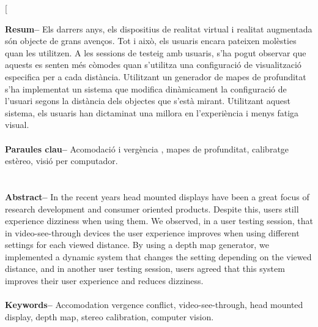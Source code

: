 \documentclass[10pt,a4paper,twocolumn,twoside]{article}
\begin{document}
	\twocolumn[\begin{@twocolumnfalse}
	
	
	\maketitle
	
	\thispagestyle{primerapagina}
	\begin{center}
	\parbox{0.915\textwidth}
	{\sffamily
	\textbf{Resum--}
	Els darrers anys, els dispositius de realitat virtual i realitat augmentada són objecte de grans avenços. Tot i això, els usuaris encara pateixen molèsties quan les utilitzen. A les sessions de testeig amb usuaris, s'ha pogut observar que aquests es senten més còmodes quan s'utilitza una configuració de visualització especifica per a cada distància. Utilitzant un generador de mapes de profunditat s'ha implementat un sistema que modifica dinàmicament la configuració de l'usuari segons la distància dels objectes que s'està mirant. Utilitzant aquest sistema, els usuaris han dictaminat una millora en l'experiència i menys fatiga visual.
	\\
	\\
	\textbf{Paraules clau-- } Acomodació i vergència , mapes de profunditat, calibratge estèreo, visió per computador.\\
	\\
	\bigskip
	\\
	\textbf{Abstract--} In the recent years head mounted displays have been a great focus of research development and consumer oriented products. Despite this, users still experience dizziness when using them. We observed, in a user testing session, that in video-see-through devices the user experience improves when using different settings for each viewed distance. By using a depth map generator, we implemented a dynamic system that changes the setting depending on the viewed distance, and in another user testing session, users agreed that this system improves their user experience and reduces dizziness. 
	\\
	\\
	\textbf{Keywords-- } Accomodation vergence conflict, video-see-through, head mounted display, depth map, stereo calibration,  computer vision. 
	}
	

\end{center}
\end{@twocolumnfalse}
\end{document}
